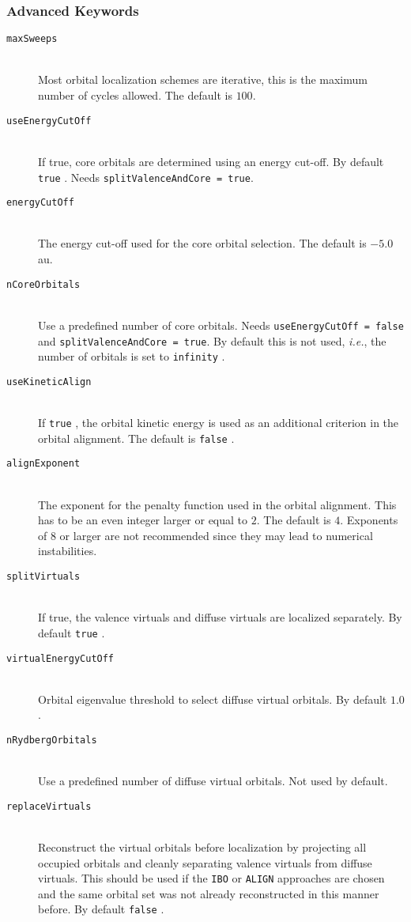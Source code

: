 \documentclass[bibliography=totocnumbered,a4paper,10pt,oneside]{scrbook}
\newcommand{\ttt}[1]{%
  \begingroup\setlength{\fboxsep}{1pt}%
  \colorbox{serenity-green!30}{\texttt{\hspace*{2pt}\vphantom{(g}#1\hspace*{2pt}}}%
  \endgroup
}
\begin{document}
\subsubsection{Advanced Keywords}
\begin{description}
 \item [\texttt{maxSweeps}]\hfill \\
   Most orbital localization schemes are iterative, this is the maximum number of cycles allowed.
   The default is $100$.
 \item [\texttt{useEnergyCutOff}]\hfill \\
   If true, core orbitals are determined using an energy cut-off. By default \ttt{true}.
   Needs \texttt{splitValenceAndCore = true}.
 \item [\texttt{energyCutOff}]\hfill \\
    The energy cut-off used for the core orbital selection. The default is $-5.0$ au.
 \item [\texttt{nCoreOrbitals}]\hfill \\
    Use a predefined number of core orbitals. Needs \texttt{useEnergyCutOff = false} and \texttt{splitValenceAndCore = true}.
    By default this is not used, \emph{i.e.}, the number of orbitals is set to \ttt{infinity}.
 \item [\texttt{useKineticAlign}]\hfill \\
   If \ttt{true}, the orbital kinetic energy is used as an additional criterion in the orbital alignment.
   The default is \ttt{false}.
 \item [\texttt{alignExponent}]\hfill \\
   The exponent for the penalty function used in the orbital alignment. This has to be an even integer
   larger or equal to $2$. The default is $4$. Exponents of $8$ or larger are not recommended since they
   may lead to numerical instabilities.
 \item [\texttt{splitVirtuals}]\hfill \\
   If true, the valence virtuals and diffuse virtuals are localized separately. By default \ttt{true}.
 \item [\texttt{virtualEnergyCutOff}]\hfill \\
   Orbital eigenvalue threshold to select diffuse virtual orbitals. By default $1.0$.
 \item [\texttt{nRydbergOrbitals}]\hfill \\
   Use a predefined number of diffuse virtual orbitals. Not used by default.
 \item [\texttt{replaceVirtuals}]\hfill \\
   Reconstruct the virtual orbitals before localization by projecting all occupied orbitals
   and cleanly separating valence virtuals from diffuse virtuals. This should be used if the
   \ttt{IBO} or \ttt{ALIGN} approaches are chosen and the same orbital set was not already reconstructed
   in this manner before. By default \ttt{false}.
\end{description}
\end{document}
